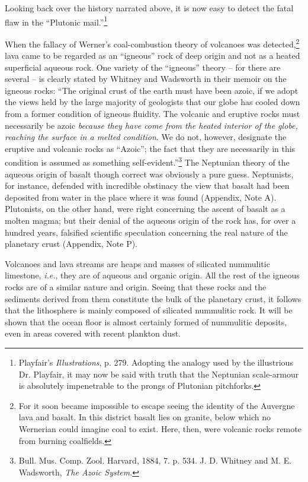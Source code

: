 \documentclass[a4paper, 12pt, oneside]{article}
\begin{document}
Looking back over the history narrated above, it is now easy to detect the fatal flaw in the ``Plutonic mail.''\footnote{Playfair's \emph{Illustrations}, p. 279. Adopting the analogy used by the illustrious Dr. Playfair, it may now be said with truth that the Neptunian scale-armour is absolutely impenetrable to the prongs of Plutonian pitchforks.}

When the fallacy of Werner's coal-combustion theory of volcanoes was detected,\footnote{For it soon became impossible to escape seeing the identity of the Auvergne lava and basalt. In this district basalt lies on granite, below which no Wernerian could imagine coal to exist. Here, then, were volcanic rocks remote from burning coalfields.} lava came to be regarded as an ``igneous'' rock of deep origin and not as a heated superficial aqueous rock. One variety of the ``igneous'' theory -- for there are several -- is clearly stated by Whitney and Wadsworth in their memoir on the igneous rocks: ``The original crust of the earth must have been azoic, if we adopt the views held by the large majority of geologists that our globe has cooled down from a former condition of igneous fluidity. The volcanic and eruptive rocks must necessarily be azoic \emph{because they have come from the heated interior of the globe, reaching the surface in a melted condition}. We do not, however, designate the eruptive and volcanic rocks as ``Azoic''; the fact that they are necessarily in this condition is assumed as something self-evident.''\footnote{Bull. Mus. Comp. Zool. Harvard, 1884, 7. p. 534. J. D. Whitney and M. E. Wadsworth, \emph{The Azoic System}.} The Neptunian theory of the aqueous origin of basalt though correct was obviously a pure guess. Neptunists, for instance, defended with incredible obstinacy the view that basalt had been deposited from water in the place where it was found (Appendix, Note A). Plutonists, on the other hand, were right concerning the ascent of basalt as a molten magma; but their denial of the aqueous origin of the rock has, for over a hundred years, falsified scientific speculation concerning the real nature of the planetary crust (Appendix, Note P).

Volcanoes and lava streams are heaps and masses of silicated nummulitic limestone, \emph{i.e.}, they are of aqueous and organic origin. All the rest of the igneous rocks are of a similar nature and origin. Seeing that these rocks and the sediments derived from them constitute the bulk of the planetary crust, it follows that the lithosphere is mainly composed of silicated nummulitic rock. It will be shown that the ocean floor is almost certainly formed of nummulitic deposits, even in areas covered with recent plankton dust.
\end{document}

